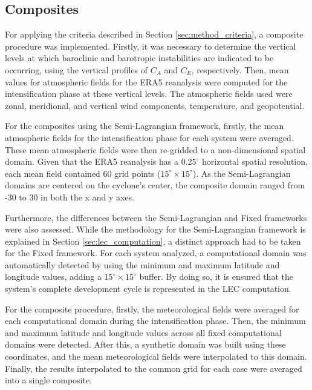 \subsection{Composites}

For applying the criteria described in Section \ref{sec:method_criteria}, a composite procedure was implemented. Firstly, it was necessary to determine the vertical levels at which baroclinic and barotropic instabilities are indicated to be occurring, using the vertical profiles of $C_A$ and $C_E$, respectively. Then, mean values for atmospheric fields for the ERA5 reanalysis were computed for the intensification phase at these vertical levels. The atmospheric fields used were zonal, meridional, and vertical wind components, temperature, and geopotential.

For the composites using the Semi-Lagrangian framework, firstly, the mean atmospheric fields for the intensification phase for each system were averaged. These mean atmospheric fields were then re-gridded to a non-dimensional spatial domain. Given that the ERA5 reanalysis has a $0.25^\circ$ horizontal spatial resolution, each mean field contained 60 grid points ($15^{\circ} \times 15^{\circ}$). As the Semi-Lagrangian domains are centered on the cyclone's center, the composite domain ranged from -30 to 30 in both the x and y axes.

Furthermore, the differences between the Semi-Lagrangian and Fixed frameworks were also assessed. While the methodology for the Semi-Lagrangian framework is explained in Section \ref{sec:lec_computation}, a distinct approach had to be taken for the Fixed framework. For each system analyzed, a computational domain was automatically detected by using the minimum and maximum latitude and longitude values, adding a $15^{\circ} \times 15^{\circ}$ buffer. By doing so, it is ensured that the system's complete development cycle is represented in the LEC computation.

For the composite procedure, firstly, the meteorological fields were averaged for each computational domain during the intensification phase. Then, the minimum and maximum latitude and longitude values across all fixed computational domains were detected. After this, a synthetic domain was built using these coordinates, and the mean meteorological fields were interpolated to this domain. Finally, the results interpolated to the common grid for each case were averaged into a single composite.




